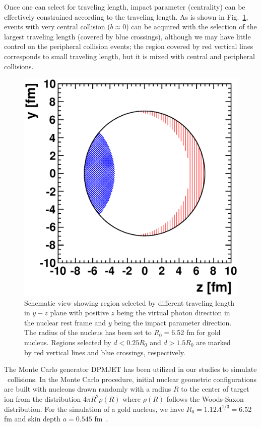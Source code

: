 Once one can select for traveling length, impact parameter (centrality)
can be effectively constrained according to the traveling length. As is shown
in Fig.~\ref{fig:distBimp}, events with very central collision ($b\approx 0$)
can be acquired with the selection of the largest traveling length (covered by blue
crossings), although we may have little control on the peripheral collision
events; the region covered by red vertical lines corresponds to small traveling length, but it
is mixed with central and peripheral collisions.
\begin{figure}[hbt]
\begin{center}
\includegraphics[width=0.55\columnwidth]{plots/chpt7/distance_to_bimpact_contour.eps}
\caption[Contour of the collision geometry selected by the specific traveling distances] 
{Schematic view showing region selected by different traveling length in $y-z$
plane with positive $z$ being the virtual photon direction in the nuclear rest
frame and $y$ being the impact parameter direction. The radius of the nucleus
has been set to $R_{0}=$6.52 fm for gold nucleus. Regions selected by
$d<0.25R_{0}$ and $d>1.5R_{0}$ are marked by red vertical lines and blue crossings, respectively.}
\label{fig:distBimp}
\end{center}
\end{figure}


The Monte Carlo generator DPMJET has been utilized in our studies to simulate
\eA\ collisions. In the Monte Carlo procedure,
initial nuclear geometric configurations are built with nucleons drawn randomly
with a radius $R$ to the center of target ion from the distribution $4\pi
R^{2}\rho(R)$ where $\rho(R)$ follows the Woods-Saxon distribution. For the
simulation of a gold nucleus, we have $R_{0}=1.12A^{1/3}=6.52$ fm and skin
depth $a=0.545$ fm~\cite{Engel:1996yb}.



